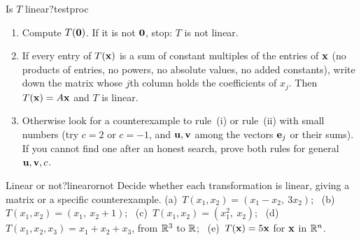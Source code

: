\documentclass[11pt]{article}
\begin{document}
\begin{proc}{Is $T$ linear?}{testproc}
\begin{enumerate}
  \item Compute $T(\mathbf{0})$. If it is not $\mathbf{0}$, stop: $T$ is not linear.
  \item If every entry of $T(\mathbf{x})$ is a sum of constant multiples of the entries of $\mathbf{x}$ (no products of entries, no powers, no absolute values, no added constants), write down the matrix whose $j$th column holds the coefficients of $x_j$. Then $T(\mathbf{x})=A\mathbf{x}$ and $T$ is linear.
  \item Otherwise look for a counterexample to rule~(i) or rule~(ii) with small numbers (try $c=2$ or $c=-1$, and $\mathbf{u},\mathbf{v}$ among the vectors $\mathbf{e}_j$ or their sums). If you cannot find one after an honest search, prove both rules for general $\mathbf{u},\mathbf{v},c$.
\end{enumerate}
\end{proc}

\begin{kc}{Linear or not?}{linearornot}
Decide whether each transformation is linear, giving a matrix or a specific counterexample.
(a)~$T(x_1,x_2)=(x_1-x_2,\ 3x_2)$; \ (b)~$T(x_1,x_2)=(x_1,\ x_2+1)$; \ (c)~$T(x_1,x_2)=(x_1^2,\ x_2)$; \ (d)~$T(x_1,x_2,x_3)=x_1+x_2+x_3$, from $\mathbb{R}^3$ to $\mathbb{R}$; \ (e)~$T(\mathbf{x})=5\mathbf{x}$ for $\mathbf{x}$ in $\mathbb{R}^n$.
\end{kc}

\begin{center}
\end{center}
\end{document}
